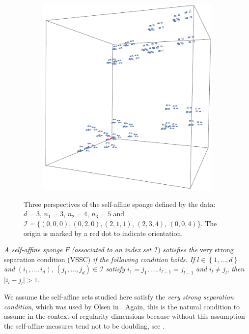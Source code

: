\begin{figure}[h]
	\begin{subfigure}{0.35\textwidth}
		\centering
		\includegraphics[width=0.85\linewidth]{pics/ch-upper-reg/sponge13.png}
		\label{ch-upper-reg:fig:sub2}
	\end{subfigure}
	\caption{Three perspectives of the self-affine sponge defined by the data: $d=3$,  $n_1=3$, $n_2=4$, $n_3=5$ and  $\mathcal{I} = \{ (0,0,0),(0,2,0),(2,1,1)$, $(2,3,4)$, $(0,0,4) \}$. The origin is marked by a red dot to indicate orientation.}
\end{figure}

\begin{definition}
	\emph{A self-affine sponge }$F$\emph{ (associated to an index set }$\mathcal{I}$)\emph{ satisfies the }very strong separation condition (VSSC)\emph{ if the following condition  holds. If }$l \in  \left\{1, \ldots, d\right\}$\emph{ and }$(i_1, \ldots, i_d)$, $(j_1 ,\ldots, j_d)\in \mathcal{I}$\emph{ satisfy }$i_1=j_1, \ldots,  i_{l-1}=j_{l-1}$\emph{ and }$i_l \neq j_l$,\emph{ then }$\lvert i_l - j_l \rvert >1$.
\end{definition} 


We assume the self-affine sets studied here satisfy the \emph{very strong separation condition}, which was used by Olsen in \cite{sponges}. Again, this is the natural condition to assume in the context of regularity dimensions because without this assumption the self-affine measures tend not to be doubling, see \cite{doublingcarpets, fraser-howroyd}.


